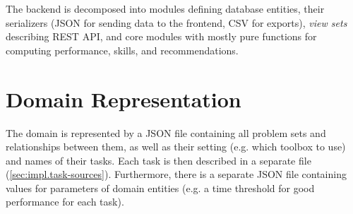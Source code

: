 
The backend is decomposed into modules defining database entities,
their serializers (JSON for sending data to the frontend, CSV for exports),
\emph{view sets} describing REST API, %
and core modules with mostly pure functions
for computing performance, skills, and recommendations.

\section{Domain Representation}

The domain is represented by a JSON file containing all problem sets %
and relationships between them, as well as their setting (e.g. which toolbox to use)
and names of their tasks.
Each task is then described in a separate file (\cref{sec:impl.task-sources}).
Furthermore, there is a separate JSON file containing values for parameters
of domain entities (e.g. a time threshold for good performance for each task).

